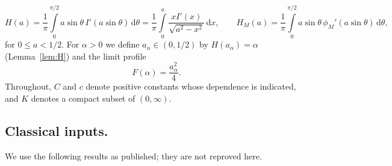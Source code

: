 \documentclass{math}
\let\TJMoriginalint\int
\renewcommand{\int}{\TJMoriginalint\limits}
\newcommand{\dd}{\,\mathrm d}
\begin{document}
\begin{equation}\label{eq:H}
H(a)=\frac1\pi\int_0^{\pi/2}a\sin\theta\,I'(a\sin\theta)\dd\theta=\frac1\pi\int_0^a\frac{xI'(x)}{\sqrt{a^2-x^2}}\dd x,\qquad H_M(a)=\frac1\pi\int_0^{\pi/2}a\sin\theta\,\phi_M'(a\sin\theta)\dd\theta ,
\end{equation}
for $0\le a<1/2$. For $\alpha>0$ we define $a_\alpha\in(0,1/2)$ by $H(a_\alpha)=\alpha$ (Lemma~\ref{lem:H}) and the limit profile
\begin{equation}\label{eq:F}
F(\alpha)=\frac{a_\alpha^2}{4}.
\end{equation}
Throughout, $C$ and $c$ denote positive constants whose dependence is indicated, and $K$ denotes a compact subset of $(0,\infty)$.

\subsection{Classical inputs.}\label{subsec:inputs}
We use the following results as published; they are not reproved here.
\end{document}
